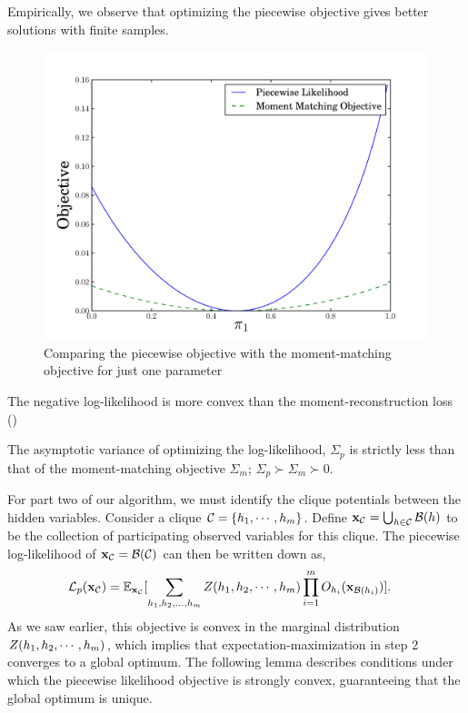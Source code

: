 Empirically, we observe that optimizing the piecewise objective gives
  better solutions with finite samples.

\begin{figure}
  \centering
  \label{fig:piecewise-objective}
  \includegraphics[width=\columnwidth]{figures/piecewise-objective.pdf}
  \caption{Comparing the piecewise objective with the moment-matching objective for just one parameter}
\end{figure}

The negative log-likelihood is more convex than the moment-reconstruction loss ()

\begin{corollary}
  The asymptotic variance of optimizing the log-likelihood, $\Sigma_p$
  is strictly less than that of the moment-matching objective
  $\Sigma_m$; $\Sigma_p \succ \Sigma_m \succ 0$.
\end{corollary}

For part two of our algorithm, we must identify the clique potentials between the
  hidden variables. 
Consider a clique $\mathcal{C} = \{h_1, \cdots, h_m\}$. 
Define $\mathbf{x}_{\mathcal{C}} = \bigcup_{h \in \mathcal{C}} \mathcal{B}(h)$ to be the collection of
  participating observed variables for this clique.
The piecewise log-likelihood of $\mathbf{x}_{\mathcal{C}} =\mathcal{B}(\mathcal{C})$ can then be
  written down as,
\begin{align}
  \mathcal{L}_p(\mathbf{x}_{\mathcal{C}}) 
    &= \mathbb{E}_{\mathbf{x}_{\mathcal{C}}}[ \sum_{h_1, h_2, \ldots, h_m} Z(h_1, h_2, \cdots, h_m) 
    \prod_{i=1}^{m} O_{h_i}(\mathbf{x}_{\mathcal{B}(h_i)}) ]. \label{eqn:piecewise}
\end{align}
As we saw earlier, this objective is convex in the marginal distribution
  $Z(h_1, h_2, \cdots, h_m)$, which implies that
  expectation-maximization in step 2 converges to a global optimum.
The following lemma describes conditions under which the piecewise
  likelihood objective is strongly convex, guaranteeing that the global
  optimum is unique.

